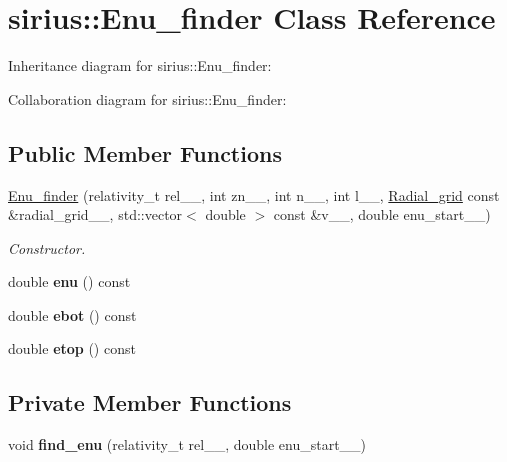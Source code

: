 \hypertarget{classsirius_1_1_enu__finder}{}\section{sirius\+:\+:Enu\+\_\+finder Class Reference}
\label{classsirius_1_1_enu__finder}


Inheritance diagram for sirius\+:\+:Enu\+\_\+finder\+:


Collaboration diagram for sirius\+:\+:Enu\+\_\+finder\+:
\subsection*{Public Member Functions}
\begin{DoxyCompactItemize}
\item 
\hyperlink{classsirius_1_1_enu__finder_ac5320110052216e2875faf782bd85e54}{Enu\+\_\+finder} (relativity\+\_\+t rel\+\_\+\+\_\+, int zn\+\_\+\+\_\+, int n\+\_\+\+\_\+, int l\+\_\+\+\_\+, \hyperlink{classsirius_1_1_radial__grid}{Radial\+\_\+grid} const \&radial\+\_\+grid\+\_\+\+\_\+, std\+::vector$<$ double $>$ const \&v\+\_\+\+\_\+, double enu\+\_\+start\+\_\+\+\_\+)
\begin{DoxyCompactList}\small\item\em Constructor. \end{DoxyCompactList}\item 
\hypertarget{classsirius_1_1_enu__finder_aea27d823297760f56be4b078fac2e71d}{}double {\bfseries enu} () const \label{classsirius_1_1_enu__finder_aea27d823297760f56be4b078fac2e71d}

\item 
\hypertarget{classsirius_1_1_enu__finder_aa41615409ca5ddf80b12a7535d921cf0}{}double {\bfseries ebot} () const \label{classsirius_1_1_enu__finder_aa41615409ca5ddf80b12a7535d921cf0}

\item 
\hypertarget{classsirius_1_1_enu__finder_a79e47d18eedb918f2875f7756ad502d2}{}double {\bfseries etop} () const \label{classsirius_1_1_enu__finder_a79e47d18eedb918f2875f7756ad502d2}

\end{DoxyCompactItemize}
\subsection*{Private Member Functions}
\begin{DoxyCompactItemize}
\item 
\hypertarget{classsirius_1_1_enu__finder_a61a8ac8ae298264a46e2df97df56ad78}{}void {\bfseries find\+\_\+enu} (relativity\+\_\+t rel\+\_\+\+\_\+, double enu\+\_\+start\+\_\+\+\_\+)\label{classsirius_1_1_enu__finder_a61a8ac8ae298264a46e2df97df56ad78}

\end{DoxyCompactItemize}
